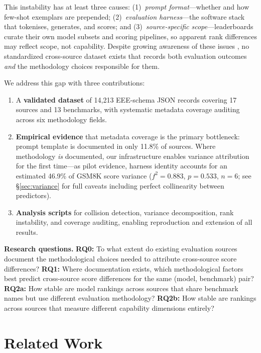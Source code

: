 \documentclass[11pt]{article}
\begin{document}
This instability has at least three causes: (1)~\emph{prompt format}---whether
and how few-shot exemplars are prepended; (2)~\emph{evaluation harness}---the
software stack that tokenises, generates, and scores; and
(3)~\emph{source-specific scope}---leaderboards curate their own model subsets
and scoring pipelines, so apparent rank differences may reflect scope, not
capability.
Despite growing awareness of these issues
\citep{biderman-2024-lessons, polo-2024-tinybenchmarks},
no standardized cross-source dataset exists that records both evaluation
outcomes \emph{and} the methodology choices responsible for them.

We address this gap with three contributions:
\begin{enumerate}
\item A \textbf{validated dataset} of 14,213 EEE-schema JSON records
  covering 17 sources and 13 benchmarks, with systematic metadata
  coverage auditing across six methodology fields.
\item \textbf{Empirical evidence} that metadata coverage is the primary
  bottleneck: prompt template is documented in only 11.8\% of sources.
  Where methodology \emph{is} documented, our infrastructure enables variance
  attribution for the first time---as pilot evidence, harness identity
  accounts for an estimated 46.9\% of GSM8K score variance
  ($f^2 = 0.883$, $p = 0.533$, $n = 6$; see \S\ref{sec:variance}
  for full caveats including perfect collinearity between predictors).
\item \textbf{Analysis scripts} for collision detection, variance
  decomposition, rank instability, and coverage auditing, enabling
  reproduction and extension of all results.
\end{enumerate}

\textbf{Research questions.}
\textbf{RQ0:} To what extent do existing evaluation sources document
the methodological choices needed to attribute cross-source score differences?
\textbf{RQ1:} Where documentation exists, which methodological factors
best predict cross-source score differences for the same (model, benchmark) pair?
\textbf{RQ2a:} How stable are model rankings across sources that share
benchmark names but use different evaluation methodology?
\textbf{RQ2b:} How stable are rankings across sources that measure
different capability dimensions entirely?

\section{Related Work}
\end{document}
